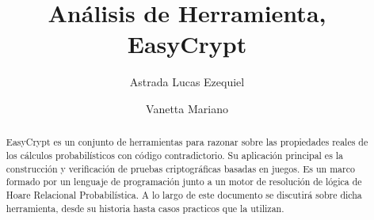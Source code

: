 \documentclass[runningheads,a4paper]{llncs}
\begin{document}
\mainmatter  %

\title{Análisis de Herramienta, EasyCrypt}


%
%
\author
{
Astrada Lucas Ezequiel
\and
Vanetta Mariano
}
%


%
%

\maketitle


\begin{abstract}    
EasyCrypt es un conjunto de herramientas para razonar sobre las propiedades reales de los cálculos probabilísticos con código contradictorio. Su aplicación principal es la construcción y verificación de pruebas criptográficas basadas en juegos. 
Es un marco formado por un lenguaje de programación junto a un motor de resolución de lógica de Hoare Relacional Probabilística. A lo largo de este documento se discutirá sobre dicha herramienta, desde su historia hasta casos practicos que la utilizan.
\cite{article1}


\end{abstract}
\end{document}
